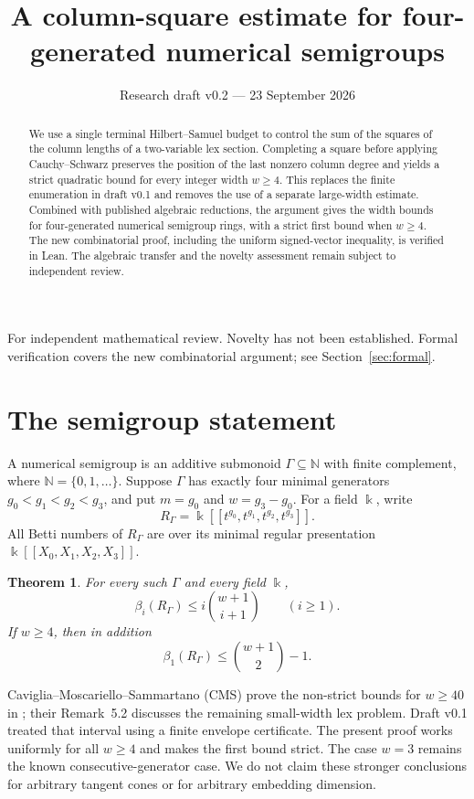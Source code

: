 \documentclass[11pt,a4paper]{article}
\title{A column-square estimate for four-generated numerical semigroups}
\author{}
\date{Research draft v0.2 --- 23 September 2026}
\newtheorem{theorem}{Theorem}[section]
\newcommand{\NN}{\mathbb N}
\newcommand{\kk}{\Bbbk}
\newcommand{\llbracket}{[\![}
\newcommand{\rrbracket}{]\!]}
\begin{document}
\maketitle
\vspace{-1.4em}
\begin{center}\small
For independent mathematical review. Novelty has not been established.
Formal verification covers the new combinatorial argument; see Section~\ref{sec:formal}.
\end{center}
\begin{abstract}
We use a single terminal Hilbert--Samuel budget to control the sum of the squares of the column lengths of a two-variable lex section. Completing a square before applying Cauchy--Schwarz preserves the position of the last nonzero column degree and yields a strict quadratic bound for every integer width $w\ge4$. This replaces the finite enumeration in draft v0.1 and removes the use of a separate large-width estimate. Combined with published algebraic reductions, the argument gives the width bounds for four-generated numerical semigroup rings, with a strict first bound when $w\ge4$. The new combinatorial proof, including the uniform signed-vector inequality, is verified in Lean. The algebraic transfer and the novelty assessment remain subject to independent review.
\end{abstract}

\section{The semigroup statement}
A numerical semigroup is an additive submonoid $\Gamma\subseteq\NN$ with finite complement, where $\NN=\{0,1,\ldots\}$. Suppose $\Gamma$ has exactly four minimal generators $g_0<g_1<g_2<g_3$, and put $m=g_0$ and $w=g_3-g_0$. For a field $\kk$, write
\[
 R_\Gamma=\kk\llbracket t^{g_0},t^{g_1},t^{g_2},t^{g_3}\rrbracket.
\]
All Betti numbers of $R_\Gamma$ are over its minimal regular presentation $\kk\llbracket X_0,X_1,X_2,X_3\rrbracket$.

\begin{theorem}\label{thm:main}
For every such $\Gamma$ and every field $\kk$,
\[
 \beta_i(R_\Gamma)\le i\binom{w+1}{i+1}\qquad(i\ge1).
\]
If $w\ge4$, then in addition
\[
 \beta_1(R_\Gamma)\le\binom{w+1}{2}-1.
\]
\end{theorem}

Caviglia--Moscariello--Sammartano (CMS) prove the non-strict bounds for $w\ge40$ in \cite[Theorem~1.5]{CMS}; their Remark~5.2 discusses the remaining small-width lex problem. Draft v0.1 treated that interval using a finite envelope certificate. The present proof works uniformly for all $w\ge4$ and makes the first bound strict. The case $w=3$ remains the known consecutive-generator case. We do not claim these stronger conclusions for arbitrary tangent cones or for arbitrary embedding dimension.
\end{document}

